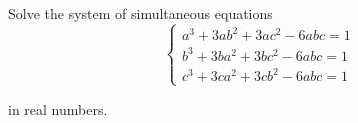 Solve the system of simultaneous equations\[\begin{cases}a^3+3ab^2+3ac^2-6abc=1\\ b^3+3ba^2+3bc^2-6abc=1\\c^3+3ca^2+3cb^2-6abc=1\end{cases}\]

in real numbers.